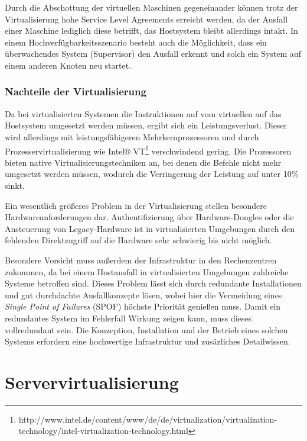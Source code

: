 Durch die Abschottung der virtuellen Maschinen gegeneinander können trotz der Virtualisierung hohe Service Level Agreements erreicht werden, da der Ausfall einer Maschine lediglich diese betrifft, das Hostsystem bleibt allerdings intakt.
In einem Hochverfügbarkeitsszenario besteht auch die Möglichkeit, dass ein überwachendes System (Supervisor) den Ausfall erkennt und solch ein System auf einem anderen Knoten neu startet.

\subsubsection{Nachteile der Virtualisierung \autocite[198]{Baun2009}}
Da bei virtualisierten Systemen die Instruktionen auf vom virtuellen auf das Hostsystem umgesetzt werden müssen, ergibt sich ein Leistungsverlust.
Dieser wird allerdings mit leistungsfähigeren Mehrkernprozessoren und durch Prozesservirtualisierung wie Intel® VT\footnote{http://www.intel.de/content/www/de/de/virtualization/virtualization-technology/intel-virtualization-technology.html} verschwindend gering.
Die Prozessoren bieten native Virtualisierungstechniken an, bei denen die Befehle nicht mehr umgesetzt werden müssen, wodurch die Verringerung der Leistung auf unter 10\% \autocite{Hardt2005} sinkt.

Ein wesentlich größeres Problem in der Virtualisierung stellen besondere Hardwareanforderungen dar.
Authentifizierung über Hardware-Dongles oder die Ansteuerung von Legacy-Hardware ist in virtualisierten Umgebungen durch den fehlenden Direktzugriff auf die Hardware sehr schwierig bis nicht möglich.

Besondere Vorsicht muss außerdem der Infrastruktur in den Rechenzentren zukommen, da bei einem Hostausfall in virtualisierten Umgebungen zahlreiche Systeme betroffen sind.
Dieses Problem lässt sich durch redundante Installationen und gut durchdachte Ausfallkonzepte lösen, wobei hier die Vermeidung eines \emph{Single Point of Failures} (SPOF) höchste Priorität genießen muss.
Damit ein redundantes System im Fehlerfall Wirkung zeigen kann, muss dieses vollredundant sein.
Die Konzeption, Installation und der Betrieb eines solchen Systems erfordern eine hochwertige Infrastruktur und zusäzliches Detailwissen.


\section{Servervirtualisierung}
\label{sec:Servervirtualisierung}
